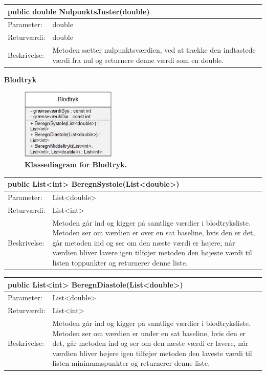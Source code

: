 \begin{table}[H]
\label{tab:tabel2}
\begin{tabular}{| l | p{13cm} |}
   \hline
   \multicolumn{2}{|l|}{public double NulpunktsJuster(double)} \\ \hline
   Parameter: & double\\ \hline
   Returværdi: & double \\ \hline
   Beskrivelse: & Metoden sætter nulpunktsværdien, ved at trække den indtastede værdi fra nul og returnere denne værdi som en double.\\ \hline
\end{tabular}
\end{table}
\textbf{Blodtryk}
\begin{figure}[H]
\includegraphics[width =0.4\textwidth , center]{billeder/klassediagramblodtryk}
\caption{\textbf{Klassediagram for Blodtryk.}}
\end{figure}
\begin{table}[H]
\label{tab:tabel2}
\begin{tabular}{| l | p{13cm} |}
   \hline
   \multicolumn{2}{|l|}{public List<int> BeregnSystole(List<double>)} \\ \hline
   Parameter: & List<double>\\ \hline
   Returværdi: & List<int> \\ \hline
   Beskrivelse: & Metoden går ind og kigger på samtlige værdier i blodtryksliste. Metoden ser om værdien er over en sat baseline, hvis den er det, går metoden ind og ser om den næste værdi er højere, når værdien bliver lavere igen tilføjer metoden den højeste værdi til listen toppunkter og returnerer denne liste. \\ \hline
\end{tabular}
\end{table}
\begin{table}[H]
\label{tab:tabel2}
\begin{tabular}{| l | p{13cm} |}
   \hline
   \multicolumn{2}{|l|}{public List<int> BeregnDiastole(List<double>)} \\ \hline
   Parameter: & List<double>\\ \hline
   Returværdi: & List<int> \\ \hline
   Beskrivelse: & Metoden går ind og kigger på samtlige værdier i blodtryksliste. Metoden ser om værdien er under en sat baseline, hvis den er det, går metoden ind og ser om den næste værdi er lavere, når værdien bliver højere igen tilføjer metoden den laveste værdi til listen minimumspunkter og returnerer denne liste. \\ \hline
\end{tabular}
\end{table}
